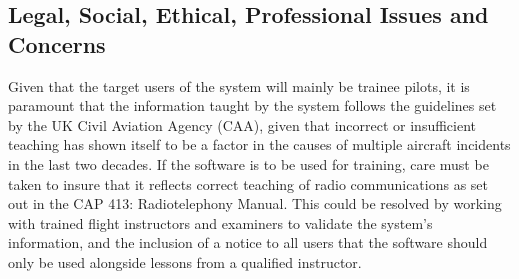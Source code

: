\subsection{Legal, Social, Ethical, Professional Issues and Concerns}
Given that the target users of the system will mainly be trainee pilots, it is paramount that the information taught by the system follows the guidelines set by the UK Civil Aviation Agency (CAA), given that incorrect or insufficient teaching has shown itself to be a factor in the causes of multiple aircraft incidents in the last two decades. If the software is to be used for training, care must be taken to insure that it reflects correct teaching of radio communications as set out in the CAP 413: Radiotelephony Manual\cite{CAP413}. This could be resolved by working with trained flight instructors and examiners to validate the system's information, and the inclusion of a notice to all users that the software should only be used alongside lessons from a qualified instructor.